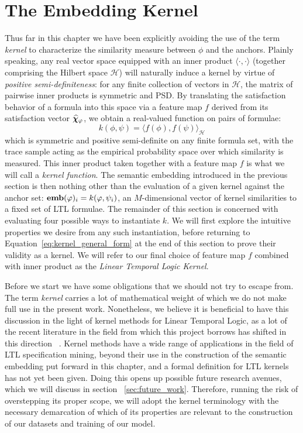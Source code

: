 \documentclass[titlepage,a4paper,11pt]{report}
\begin{document}
    \section{The Embedding Kernel}\label{sec:the_embedding_kernel}
    Thus far in this chapter we have been explicitly avoiding the use of the term \emph{kernel} to characterize the similarity measure between $\phi$ and the anchors. Plainly speaking, any real vector space equipped with an inner product $\langle \cdot, \cdot \rangle$ (together comprising the Hilbert space $\mathcal{H}$) will naturally induce a kernel by virtue of \emph{positive semi-definiteness}: for any finite collection of vectors in $\mathcal{H}$, the matrix of pairwise inner products is symmetric and PSD. By translating the satisfaction behavior of a formula into this space via a feature map $f$ derived from its satisfaction vector $\bm{\widehat\chi}_\varphi$, we obtain a real-valued function on pairs of formulae:
    \begin{equation} \label{eq:kernel_general_form}
        k(\phi, \psi) = \bigl\langle f(\phi), f(\psi)\bigr\rangle_\mathcal{H}
    \end{equation}
    which is symmetric and positive semi-definite on any finite formula set, with the trace sample acting as the empirical probability space over which similarity is measured. This inner product taken together with a feature map $f$ is what we will call a \textit{kernel function}. The semantic embedding introduced in the previous section is then nothing other than the evaluation of a given kernel against the anchor set: $\textbf{emb}(\varphi)_i = k(\varphi, \psi_i)$, an $M$-dimensional vector of kernel similarities to a fixed set of LTL formulae. The remainder of this section is concerned with evaluating four possible ways to instantiate $k$. We will first explore the intuitive properties we desire from any such instantiation, before returning to Equation~\eqref{eq:kernel_general_form} at the end of this section to prove their validity as a kernel. We will refer to our final choice of feature map $f$ combined with inner product as the \emph{Linear Temporal Logic Kernel}.
    
    Before we start we have some obligations that we should not try to escape from. The term \emph{kernel} carries a lot of mathematical weight of which we do not make full use in the present work. Nonetheless, we believe it is beneficial to have this discussion in the light of kernel methods for Linear Temporal Logic, as a lot of the recent literature in the field from which this project borrows has shifted in this direction ~\citep{bortolussi_kernel_2020,bortolussi_learning_2022,candussio_bridging_2025,saveri_stl2vec_2024}. Kernel methods have a wide range of applications in the field of LTL specification mining, beyond their use in the construction of the semantic embedding put forward in this chapter, and a formal definition for LTL kernels has not yet been given. Doing this opens up possible future research avenues, which we will discuss in section ~\ref{sec:future_work}. Therefore, running the risk of overstepping its proper scope, we will adopt the kernel terminology with the necessary demarcation of which of its properties are relevant to the construction of our datasets and training of our model. 
\end{document}

